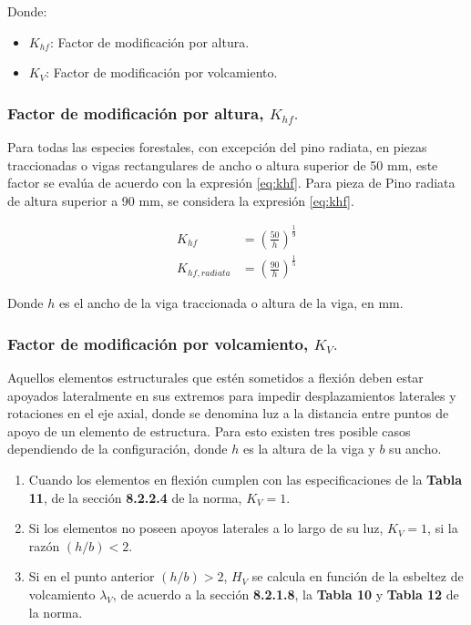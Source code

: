 Donde:
\begin{itemize}
	\item[] $K_{hf}$: Factor de modificación por altura.
	\item[] $K_V$: Factor de modificación por volcamiento.
\end{itemize}

\subsubsection{Factor de modificación por altura, $K_{hf}.$}
Para todas las especies forestales, con excepción del pino radiata, en piezas traccionadas o vigas rectangulares de ancho o altura superior de 50 mm, este factor se evalúa de acuerdo con la expresión \ref{eq:khf}. Para pieza de Pino radiata de altura superior a 90 mm, se considera la expresión \ref{eq:khf}.

\begin{subequations}
\begin{align}
	K_{hf}&=\left(\frac{50}{h}\right)^{\frac{1}{9}} \label{eq:khf}\\
	K_{hf,radiata}&=\left(\frac{90}{h}\right)^{\frac{1}{5}} \label{eq:khfr}
\end{align}
\end{subequations}

Donde $h$ es el ancho de la viga traccionada o altura de la viga, en mm.
\subsubsection{Factor de modificación por volcamiento, $K_V.$} Aquellos elementos estructurales que estén sometidos a flexión deben estar apoyados lateralmente en sus extremos para impedir desplazamientos laterales y rotaciones en el eje axial, donde se denomina luz a la distancia entre puntos de apoyo de un elemento de estructura. Para esto existen tres posible casos dependiendo de la configuración, donde $h$ es la altura de la viga y $b$ su ancho.
\begin{enumerate}
	\item Cuando los elementos en flexión cumplen con las especificaciones de la \textbf{Tabla 11}, de la sección \textbf{8.2.2.4} de la norma, $K_V= 1$.
	\item Si los elementos no poseen apoyos laterales a lo largo de su luz, $K_V = 1$, si la razón $(h/b) < 2$.
	\item Si en el punto anterior $(h/b) > 2$, $H_V$ se calcula en función de la esbeltez de volcamiento $\lambda_V$, de acuerdo a la sección \textbf{8.2.1.8}, la \textbf{Tabla 10} y \textbf{Tabla 12} de la norma.
\end{enumerate}

